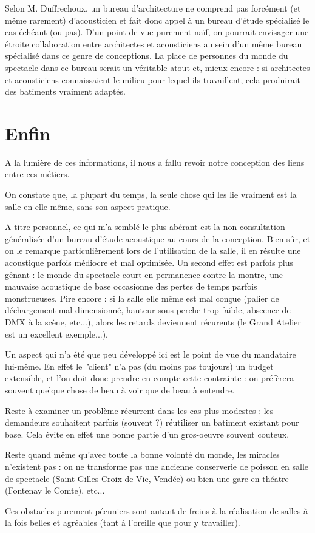 \documentclass[a4paper, 11pt]{report}
\begin{document}
Selon M. {\sc Duffrechoux}, un bureau d'architecture ne comprend pas forcément (et même rarement) d'acousticien et fait donc appel à un bureau d'étude spécialisé le cas échéant (ou pas).
D'un point de vue purement naïf, on pourrait envisager une étroite collaboration entre architectes et acousticiens au sein d'un même bureau spécialisé dans ce genre de conceptions.
La place de personnes du monde du spectacle dans ce bureau serait un véritable atout et, mieux encore : si architectes et acousticiens connaissaient le milieu pour lequel ils travaillent, cela produirait des batiments vraiment adaptés.

\section{Enfin}

A la lumière de ces informations, il nous a fallu revoir notre conception des liens entre ces métiers.

On constate que, la plupart du temps, la seule chose qui les lie vraiment est la salle en elle-même, sans son aspect pratique.

A titre personnel, ce qui m'a semblé le plus abérant est la non-consultation généralisée d'un bureau d'étude acoustique au cours de la conception.
Bien sûr, et on le remarque particulièrement lors de l'utilisation de la salle, il en résulte une acoustique parfois médiocre et mal optimisée.
Un second effet est parfois plus gênant : le monde du spectacle court en permanence contre la montre, une mauvaise acoustique de base occasionne des pertes de temps parfois monstrueuses. Pire encore : si la salle elle même est mal conçue (palier de déchargement mal dimensionné, hauteur sous perche trop faible, abscence de DMX à la scène, etc...), alors les retards deviennent récurents (le Grand Atelier est un excellent exemple...).

Un aspect qui n'a été que peu développé ici est le point de vue du mandataire lui-même.
En effet le {\emph "client"} n'a pas (du moins pas toujours) un budget extensible, et l'on doit donc prendre en compte cette contrainte : on préfèrera souvent quelque chose de beau à voir que de beau à entendre.

Reste à examiner un problème récurrent dans les cas plus modestes : les demandeurs souhaitent parfois (souvent ?) réutiliser un batiment existant pour base.
Cela évite en effet une bonne partie d'un gros-oeuvre souvent couteux.

Reste quand même qu'avec toute la bonne volonté du monde, les miracles n'existent pas : on ne transforme pas une ancienne conserverie de poisson en salle de spectacle (Saint Gilles Croix de Vie, Vendée) ou bien une gare en théatre (Fontenay le Comte), etc...


Ces obstacles purement pécuniers sont autant de freins à la réalisation de salles à la fois belles et agréables (tant à l'oreille que pour y travailler).
\end{document}
